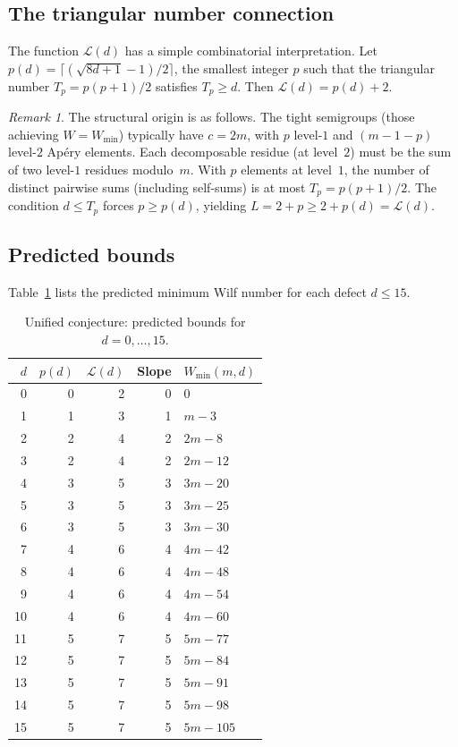 \documentclass[11pt]{amsart}
\theoremstyle{definition}
\theoremstyle{remark}
\newtheorem{remark}[theorem]{Remark}
\begin{document}
\subsection{The triangular number connection}

The function $\mathcal{L}(d)$ has a simple combinatorial interpretation.
Let $p(d) = \lceil (\sqrt{8d+1} - 1)/2 \rceil$, the smallest integer $p$
such that the triangular number $T_p = p(p+1)/2$ satisfies $T_p \ge d$.
Then $\mathcal{L}(d) = p(d) + 2$.

\begin{remark}
The structural origin is as follows.  The tight semigroups (those achieving
$W = W_{\min}$) typically have $c = 2m$, with $p$ level-$1$ and $(m - 1 - p)$
level-$2$ Ap\'ery elements.  Each decomposable residue (at level~$2$) must be the
sum of two level-$1$ residues modulo~$m$.
With $p$ elements at level~$1$, the number of distinct pairwise sums
(including self-sums) is at most $T_p = p(p+1)/2$.
The condition $d \le T_p$ forces $p \ge p(d)$, yielding
$L = 2 + p \ge 2 + p(d) = \mathcal{L}(d)$.
\end{remark}

\subsection{Predicted bounds}

Table~\ref{tab:conjecture} lists the predicted minimum Wilf number
for each defect $d \le 15$.

\begin{table}[ht]
\centering
\caption{Unified conjecture: predicted bounds for $d = 0, \ldots, 15$.}\label{tab:conjecture}
\begin{tabular}{rrrrl}
\toprule
$d$ & $p(d)$ & $\mathcal{L}(d)$ & Slope & $W_{\min}(m, d)$ \\
\midrule
0  & 0 & 2 & 0 & $0$ \\
1  & 1 & 3 & 1 & $m - 3$ \\
2  & 2 & 4 & 2 & $2m - 8$ \\
3  & 2 & 4 & 2 & $2m - 12$ \\
4  & 3 & 5 & 3 & $3m - 20$ \\
5  & 3 & 5 & 3 & $3m - 25$ \\
6  & 3 & 5 & 3 & $3m - 30$ \\
7  & 4 & 6 & 4 & $4m - 42$ \\
8  & 4 & 6 & 4 & $4m - 48$ \\
9  & 4 & 6 & 4 & $4m - 54$ \\
10 & 4 & 6 & 4 & $4m - 60$ \\
11 & 5 & 7 & 5 & $5m - 77$ \\
12 & 5 & 7 & 5 & $5m - 84$ \\
13 & 5 & 7 & 5 & $5m - 91$ \\
14 & 5 & 7 & 5 & $5m - 98$ \\
15 & 5 & 7 & 5 & $5m - 105$ \\
\bottomrule
\end{tabular}
\end{table}
\end{document}
